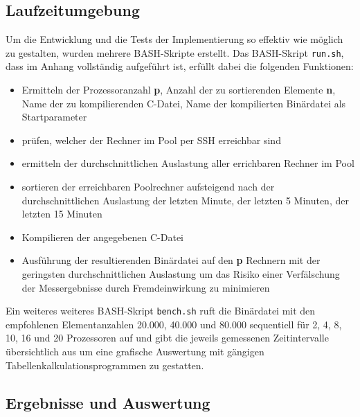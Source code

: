 \documentclass[a4paper,12pt]{scrartcl}
\begin{document}
\subsection{Laufzeitumgebung}
Um die Entwicklung und die Tests der Implementierung so effektiv wie m\"oglich zu gestalten, wurden mehrere BASH-Skripte erstellt.
Das BASH-Skript \texttt{run.sh}, dass im Anhang vollst\"andig aufgef\"uhrt ist,  erf\"ullt dabei die folgenden Funktionen:
\begin{itemize}
 \item Ermitteln der Prozessoranzahl \textbf{p}, Anzahl der zu sortierenden Elemente \textbf{n}, Name der zu kompilierenden C-Datei, Name der kompilierten
Bin\"ardatei als Startparameter
 \item pr\"ufen, welcher der Rechner im Pool per SSH erreichbar sind
 \item ermitteln der durchschnittlichen Auslastung aller errichbaren Rechner im Pool
 \item sortieren der erreichbaren Poolrechner aufsteigend nach der durchschnittlichen Auslastung der letzten Minute, der letzten 5 Minuten, der letzten 15
Minuten
 \item Kompilieren der angegebenen C-Datei
 \item Ausf\"uhrung der resultierenden Bin\"ardatei auf den \textbf{p} Rechnern mit der geringsten durchschnittlichen Auslastung um das Risiko einer
Verf\"alschung der Messergebnisse durch Fremdeinwirkung zu minimieren
\end{itemize}


Ein weiteres weiteres BASH-Skript \texttt{bench.sh} ruft die Bin\"ardatei mit den empfohlenen Elementanzahlen 20.000, 40.000 und 80.000 sequentiell f\"ur 2, 4,
8, 10, 16 und 20 Prozessoren auf und gibt die jeweils gemessenen Zeitintervalle \"ubersichtlich aus um eine grafische Auswertung mit g\"angigen
Tabellenkalkulationsprogrammen zu gestatten. 

\subsection{Ergebnisse und Auswertung}
\end{document}
